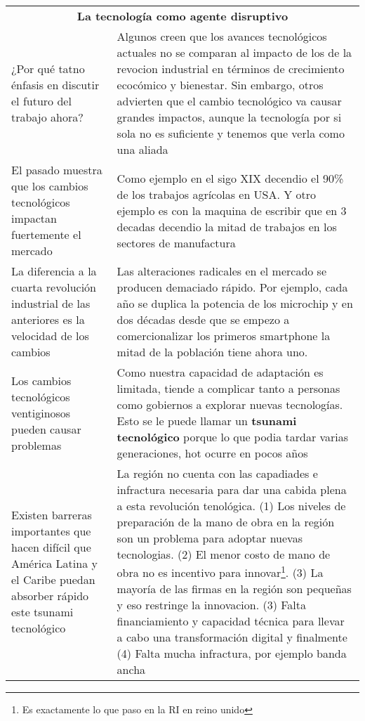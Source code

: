 \begingroup
\setlength{\tabcolsep}{12pt} %
\renewcommand{\arraystretch}{1.5} %
\begin{tabular}{p{4cm}|p{11cm}}
\multicolumn{2}{c}{\large \bf  La tecnología como agente disruptivo}  \\
¿Por qué tatno énfasis en discutir el futuro del trabajo ahora?&Algunos creen que los avances tecnológicos actuales no se comparan al impacto de los de la revocion industrial en términos de crecimiento ecocómico y bienestar. Sin embargo, otros advierten que el cambio tecnológico va causar grandes impactos, aunque la tecnología por si sola no es suficiente y tenemos que verla como una aliada\\
El pasado muestra que los cambios tecnológicos impactan fuertemente el mercado&Como ejemplo en el sigo XIX decendio el 90\% de los trabajos agrícolas en USA. Y otro ejemplo es con la maquina de escribir que en 3 decadas decendio la mitad de trabajos en los sectores de manufactura\\
La diferencia a la cuarta revolución industrial de las anteriores es la velocidad de los cambios&Las alteraciones radicales en el mercado se producen demaciado rápido. Por ejemplo, cada año se duplica la potencia de los microchip y en dos décadas desde que se empezo a comercionalizar los primeros smartphone la mitad de la población tiene ahora uno.\\
Los cambios tecnológicos ventiginosos pueden causar problemas&Como nuestra capacidad de adaptación es limitada, tiende a complicar tanto a personas como gobiernos a explorar nuevas tecnologías. Esto se le puede llamar un {\bf tsunami tecnológico} porque lo que podia tardar varias generaciones, hot ocurre en pocos años\\
Existen barreras importantes que hacen difícil que América  Latina y el Caribe puedan absorber rápido este tsunami tecnológico&La región no cuenta con las capadiades e infractura necesaria para dar una cabida plena a esta revolución tenológica. (1) Los niveles de preparación de la mano de obra en la región son un problema para adoptar nuevas tecnologias. (2) El menor costo de mano de obra no es incentivo para innovar\footnote{Es exactamente lo que paso en la RI en reino unido}. (3) La mayoría de las firmas en la región son pequeñas y eso restringe la innovacion. (3) Falta financiamiento y capacidad técnica para llevar a cabo una transformación digital y finalmente (4) Falta mucha infractura, por ejemplo banda ancha\\
\end{tabular}
\endgroup


